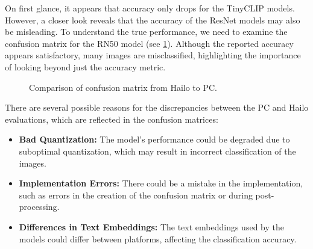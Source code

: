 On first glance, it appears that accuracy only drops for the TinyCLIP models.
However, a closer look reveals that the accuracy of the ResNet models may also be misleading.
To understand the true performance, we need to examine the confusion matrix for the RN50 model (see \cref{methods:fig:compareConfM}).
Although the reported accuracy appears satisfactory, many images are misclassified, highlighting the importance of looking beyond just the accuracy metric.

\begin{figure}[!h]
    \centering
    \label{methods:fig:compareConfM}
    \caption{Comparison of confusion matrix from Hailo to PC.}
\end{figure}

There are several possible reasons for the discrepancies between the PC and Hailo evaluations, which are reflected in the confusion matrices:
\begin{itemize}
    \item \textbf{Bad Quantization:} The model's performance could be degraded due to suboptimal quantization, which may result in incorrect classification of the images.
    \item \textbf{Implementation Errors:} There could be a mistake in the implementation, such as errors in the creation of the confusion matrix or during post-processing.
    \item \textbf{Differences in Text Embeddings:} The text embeddings used by the models could differ between platforms, affecting the classification accuracy.
\end{itemize}


